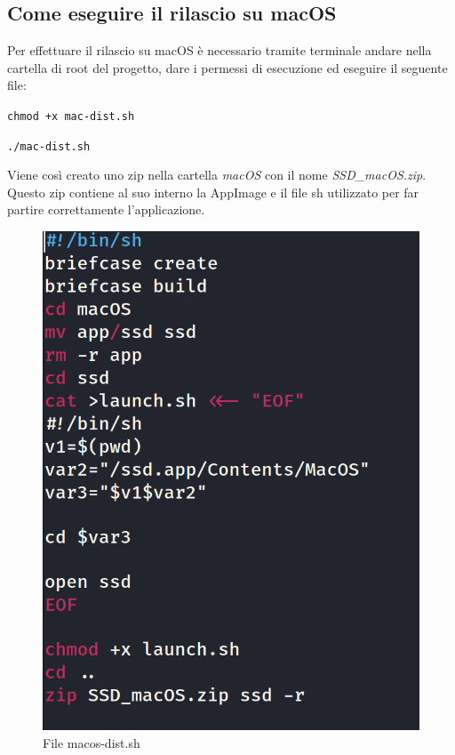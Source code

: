 \subsection{Come eseguire il rilascio su macOS}
Per effettuare il rilascio su macOS è necessario tramite terminale andare nella cartella di root del progetto, dare i permessi di esecuzione ed eseguire il seguente file:
\newline{}\centerline{\texttt{chmod +x mac-dist.sh}}
\newline{}\centerline{\texttt{./mac-dist.sh}}\newline{}
Viene così creato uno zip nella cartella \textit{macOS} con il nome \textit{SSD\_macOS.zip}. \\
Questo zip contiene al suo interno la AppImage e il file sh utilizzato per far partire correttamente l'applicazione.
\begin{figure}[H]
    \centering
    \includegraphics[scale = 0.5]{components/img/macos-deploy-script.png}
    \caption{File macos-dist.sh}
    \label{fig:File macos-dist.bat}
\end{figure}


